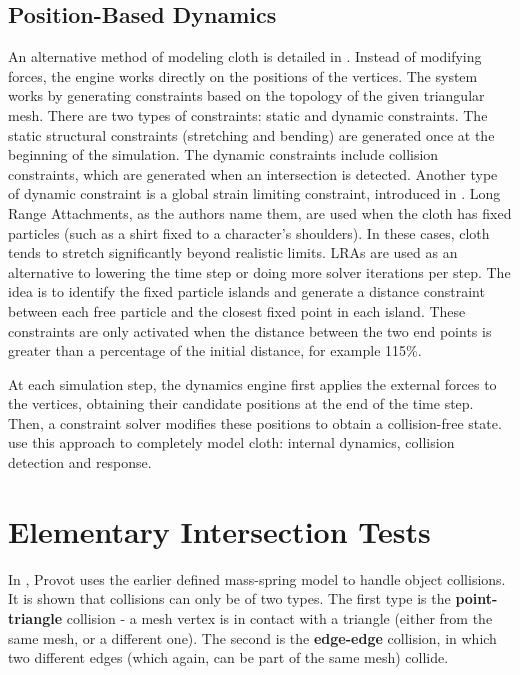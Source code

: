 \subsection{Position-Based Dynamics}
\label{sub-sec:pbd}

An alternative method of modeling cloth is detailed in \citep{mullerpbd}. Instead of modifying forces, the engine works directly on the positions of the vertices. The system works by generating constraints based on the topology of the given triangular mesh. There are two types of constraints: static and dynamic constraints. The static structural constraints (stretching and bending) are generated once at the beginning of the simulation. The dynamic constraints include collision constraints, which are generated when an intersection is detected.  Another type of dynamic constraint is a global strain limiting constraint, introduced in \citep{kim2012}. Long Range Attachments, as the authors name them, are used when the cloth has fixed particles (such as a shirt fixed to a character's shoulders). In these cases, cloth tends to stretch significantly beyond realistic limits. LRAs are used as an alternative to lowering the time step or doing more solver iterations per step. The idea is to identify the fixed particle islands and generate a distance constraint between each free particle and the closest fixed point in each island. These constraints are only activated when the distance between the two end points is greater than a percentage of the initial distance, for example 115\%.

At each simulation step, the dynamics engine first applies the external forces to the vertices, obtaining their candidate positions at the end of the time step. Then, a constraint solver modifies these positions to obtain a collision-free state. \citep{mullerpbd} use this approach to completely model cloth: internal dynamics, collision detection and response.

\section{Elementary Intersection Tests}
\label{sec:eit}

In \citep{provot97}, Provot uses the earlier defined mass-spring model \citep{provot95} to handle object collisions. It is shown that collisions can only be of two types. The first type is the \textbf{point-triangle} collision - a mesh vertex is in contact with a triangle (either from the same mesh, or a different one). The second is the \textbf{edge-edge} collision, in which two different edges (which again, can be part of the same mesh) collide.

